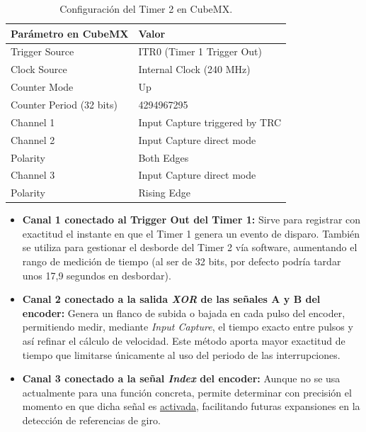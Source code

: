 \documentclass[11pt]{report}
\begin{document}
\begin{table}[h!]
	\centering
	\begin{tabular}{| l | l |}
		\hline
		\textbf{Parámetro en CubeMX} & \textbf{Valor}                 \\
		\hline
		Trigger Source               & ITR0 (Timer 1 Trigger Out)     \\
		Clock Source                 & Internal Clock (240 MHz)       \\
		Counter Mode                 & Up                             \\
		Counter Period (32 bits)     & 4294967295                     \\
		\hline
		Channel 1                    & Input Capture triggered by TRC \\
		\hline
		Channel 2                    & Input Capture direct mode      \\
		Polarity                     & Both Edges                     \\
		\hline
		Channel 3                    & Input Capture direct mode      \\
		Polarity                     & Rising Edge                    \\
		\hline
	\end{tabular}
	\caption{Configuración del Timer 2 en CubeMX.}
	\label{TIM2_config}
\end{table}
\FloatBarrier

\begin{itemize}
	\item \textbf{Canal 1 conectado al Trigger Out del Timer 1:} Sirve para registrar con exactitud el instante en que el Timer 1 genera un evento de disparo. También se utiliza para gestionar el desborde del Timer 2 vía software, aumentando el rango de medición de tiempo (al ser de 32 bits, por defecto podría tardar unos 17,9 segundos en desbordar).

	\item \textbf{Canal 2 conectado a la salida \emph{XOR} de las señales A y B del encoder:} Genera un flanco de subida o bajada en cada pulso del encoder, permitiendo medir, mediante \emph{Input Capture}, el tiempo exacto entre pulsos y así refinar el cálculo de velocidad. Este método aporta mayor exactitud de tiempo que limitarse únicamente al uso del periodo de las interrupciones.

	\item \textbf{Canal 3 conectado a la señal \emph{Index} del encoder:} Aunque no se usa actualmente para una función concreta, permite determinar con precisión el momento en que dicha señal es \href{https://www.youtube.com/watch?v=FavUpD_IjVY}{activada}, facilitando futuras expansiones en la detección de referencias de giro.
\end{itemize}
\end{document}
